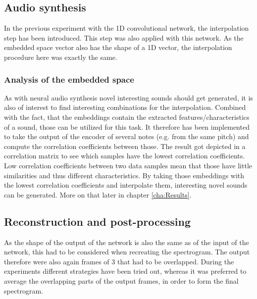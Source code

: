 \subsection{Audio synthesis}
In the previous experiment with the 1D convolutional network, the interpolation step has been introduced. This step was also applied with this network. As the embedded space vector also has the shape of a 1D vector, the interpolation procedure here was exactly the same. 

\subsubsection{Analysis of the embedded space}
As with neural audio synthesis novel interesting sounds should get generated, it is also of interest to find interesting combinations for the interpolation. Combined with the fact, that the embeddings contain the extracted features/characteristics of a sound, those can be utilized for this task. It therefore has been implemented to take the output of the encoder of several notes (e.g. from the same pitch) and compute the correlation coefficients between those. The result got depicted in a correlation matrix to see which samples have the lowest correlation coefficients. Low correlation coefficients between two data samples mean that those have little similarities and thus different characteristics. By taking those embeddings with the lowest correlation coefficients and interpolate them, interesting novel sounds can be generated. More on that later in chapter \ref{cha:Results}.

\subsection{Reconstruction and post-processing}
As the shape of the output of the network is also the same as of the input of the network, this had to be considered when recreating the spectrogram. The output therefore were also again frames of 3 that had to be overlapped. During the experiments different strategies have been tried out, whereas it was preferred to average the overlapping parts of the output frames, in order to form the final spectrogram.


